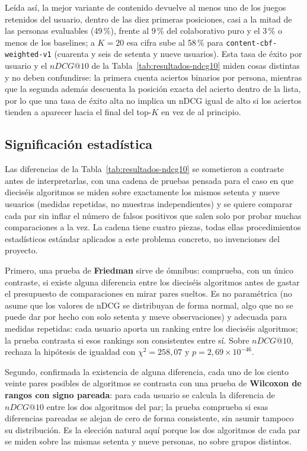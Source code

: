 Leída así, la mejor variante de contenido devuelve al menos uno de los juegos retenidos del
usuario, dentro de las diez primeras posiciones, casi a la mitad de las personas evaluables
(49\,\%), frente al 9\,\% del colaborativo puro y el 3\,\% o menos de los baselines; a
\(K=20\) esa cifra sube al 58\,\% para \texttt{content-cbf-weighted-v1} (cuarenta y seis de
setenta y nueve usuarios). Esta tasa de éxito por usuario y el \(nDCG@10\) de la
Tabla~\ref{tab:resultados-ndcg10} miden cosas distintas y no deben confundirse: la primera
cuenta aciertos binarios por persona, mientras que la segunda además descuenta la posición
exacta del acierto dentro de la lista, por lo que una tasa de éxito alta no implica un nDCG
igual de alto si los aciertos tienden a aparecer hacia el final del top-\(K\) en vez de al
principio.

\subsection{Significación estadística}\label{sec:exp-significacion}

Las diferencias de la Tabla~\ref{tab:resultados-ndcg10} se sometieron a contraste antes de
interpretarlas, con una cadena de pruebas pensada para el caso en que dieciséis algoritmos se
miden sobre exactamente los mismos setenta y nueve usuarios (medidas repetidas, no muestras
independientes) y se quiere comparar cada par sin inflar el número de falsos positivos que
salen solo por probar muchas comparaciones a la vez. La cadena tiene cuatro piezas, todas ellas
procedimientos estadísticos estándar aplicados a este problema concreto, no invenciones del
proyecto.

Primero, una prueba de \textbf{Friedman} sirve de ómnibus: comprueba, con un único contraste,
si existe alguna diferencia entre los dieciséis algoritmos antes de gastar el presupuesto de
comparaciones en mirar pares sueltos. Es no paramétrica (no asume que los valores de nDCG se
distribuyan de forma normal, algo que no se puede dar por hecho con solo setenta y nueve
observaciones) y adecuada para medidas repetidas: cada usuario aporta un ranking entre los
dieciséis algoritmos; la prueba contrasta si esos rankings son consistentes entre sí. Sobre
\(nDCG@10\), rechaza la hipótesis de igualdad con \(\chi^2=258{,}07\) y
\(p=2{,}69\times10^{-46}\).

Segundo, confirmada la existencia de alguna diferencia, cada uno de los ciento veinte pares
posibles de algoritmos se contrasta con una prueba de \textbf{Wilcoxon de rangos con signo
pareada}: para cada usuario se calcula la diferencia de \(nDCG@10\) entre los dos algoritmos
del par; la prueba comprueba si esas diferencias pareadas se alejan de cero de forma
consistente, sin asumir tampoco su distribución. Es la elección natural aquí porque los dos
algoritmos de cada par se miden sobre las mismas setenta y nueve personas, no sobre grupos
distintos.


